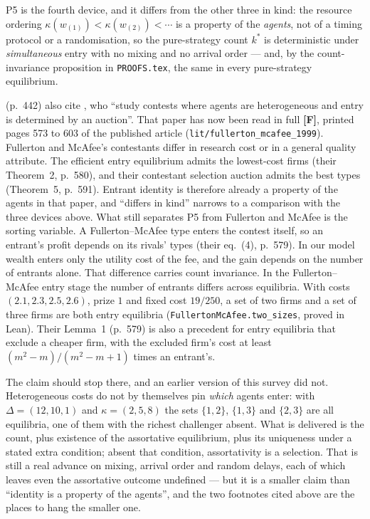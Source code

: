 \documentclass[11pt,a4paper]{article}
\begin{document}
P5 is the fourth device, and it differs from the other three in kind: the
resource ordering $\kappa(w_{(1)}) < \kappa(w_{(2)}) < \cdots$ is a property of
the \emph{agents}, not of a timing protocol or a randomisation, so the
pure-strategy count $k^*$ is deterministic under \emph{simultaneous} entry with
no mixing and no arrival order --- and, by the count-invariance proposition in
\texttt{PROOFS.tex}, the same in every pure-strategy equilibrium.

\citet{MorganOrzenSefton2012} (p.~442) also cite \citet{FullertonMcAfee1999},
who ``study contests where agents are heterogeneous and entry is determined by
an auction''. That paper has now been read in full \textbf{[F]}, printed pages
573 to 603 of the published article (\texttt{lit/fullerton\_mcafee\_1999}).
Fullerton and McAfee's contestants differ in research cost or in a general
quality attribute. The efficient entry equilibrium admits the lowest-cost firms
(their Theorem~2, p.~580), and their contestant selection auction admits the
best types (Theorem~5, p.~591). Entrant identity is therefore already a
property of the agents in that paper, and ``differs in kind'' narrows to a
comparison with the three devices above. What still separates P5 from
Fullerton and McAfee is the sorting variable. A Fullerton--McAfee type enters
the contest itself, so an entrant's profit depends on its rivals' types (their
eq.~(4), p.~579). In our model wealth enters only the utility cost of the fee,
and the gain depends on the number of entrants alone. That difference carries
count invariance. In the Fullerton--McAfee entry stage the number of entrants
differs across equilibria. With costs $(2.1, 2.3, 2.5, 2.6)$, prize $1$ and
fixed cost $19/250$, a set of two firms and a set of three firms are both entry
equilibria (\texttt{FullertonMcAfee.two\_sizes}, proved in Lean). Their
Lemma~1 (p.~579) is also a precedent for entry equilibria that exclude a
cheaper firm, with the excluded firm's cost at least $(m^2-m)/(m^2-m+1)$ times
an entrant's.

The claim should stop there, and an earlier version of this survey did not.
Heterogeneous costs do not by themselves pin \emph{which} agents enter: with
$\Delta=(12,10,1)$ and $\kappa=(2,5,8)$ the sets $\{1,2\}$, $\{1,3\}$ and
$\{2,3\}$ are all equilibria, one of them with the richest challenger absent.
What is delivered is the count, plus existence of the assortative equilibrium,
plus its uniqueness under a stated extra condition; absent that condition,
assortativity is a selection. That is still a real advance on mixing, arrival
order and random delays, each of which leaves even the assortative outcome
undefined --- but it is a smaller claim than ``identity is a property of the
agents'', and the two footnotes cited above are the places to hang the smaller
one.
\end{document}
